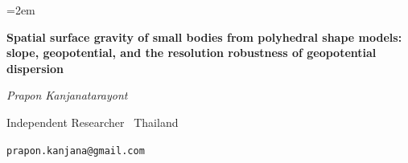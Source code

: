 \documentclass[11pt,a4paper]{article}
\begin{document}
\emergencystretch=2em
\begin{center}
{\LARGE\bfseries Spatial surface gravity of small bodies from polyhedral
shape models: slope, geopotential, and the resolution robustness of
geopotential dispersion\par}
\vspace{0.8em}
{\itshape Prapon Kanjanatarayont\par}
\vspace{0.2em}
{\small\color{gray} Independent Researcher \textperiodcentered\ Thailand\par}
\vspace{0.1em}
{\small\color{gray} \texttt{prapon.kanjana@gmail.com}\par}
\end{center}
\vspace{1.0em}















\appendix

\end{document}
